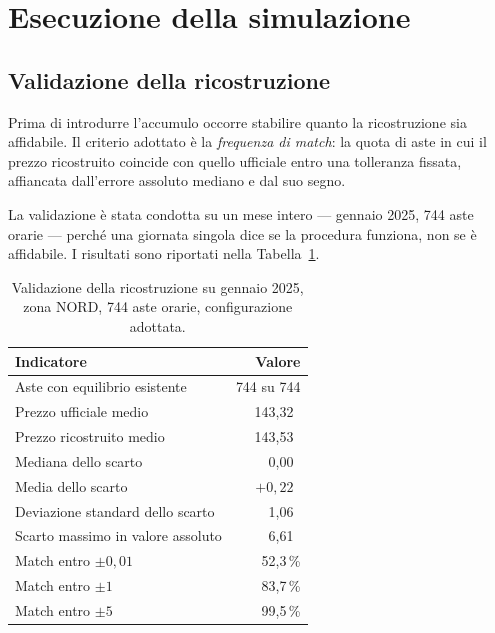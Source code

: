 \section{Esecuzione della simulazione}
\label{sec:esecuzione}

\subsection{Validazione della ricostruzione}

Prima di introdurre l'accumulo occorre stabilire quanto la ricostruzione sia affidabile. Il
criterio adottato \`e la \emph{frequenza di match}: la quota di aste in cui il prezzo
ricostruito coincide con quello ufficiale entro una tolleranza fissata, affiancata
dall'errore assoluto mediano e dal suo segno.

La validazione \`e stata condotta su un mese intero — gennaio 2025, 744 aste orarie — perch\'e
una giornata singola dice se la procedura funziona, non se \`e affidabile. I risultati sono
riportati nella Tabella~\ref{tab:validazione}.

\begin{table}[H]
\centering
\caption{Validazione della ricostruzione su gennaio 2025, zona NORD, 744 aste orarie,
         configurazione adottata.}
\label{tab:validazione}
\begin{tabular}{@{}lr@{}}
\toprule
\textbf{Indicatore} & \textbf{Valore} \\
\midrule
Aste con equilibrio esistente            & 744 su 744 \\
Prezzo ufficiale medio                   & 143{,}32~\euromwh{} \\
Prezzo ricostruito medio                 & 143{,}53~\euromwh{} \\
Mediana dello scarto                     & 0{,}00~\euromwh{} \\
Media dello scarto                       & $+0{,}22$~\euromwh{} \\
Deviazione standard dello scarto         & 1{,}06~\euromwh{} \\
Scarto massimo in valore assoluto        & 6{,}61~\euromwh{} \\
Match entro $\pm 0{,}01$~\euromwh{}      & 52{,}3\,\% \\
Match entro $\pm 1$~\euromwh{}           & 83{,}7\,\% \\
Match entro $\pm 5$~\euromwh{}           & 99{,}5\,\% \\
\bottomrule
\end{tabular}
\end{table}


